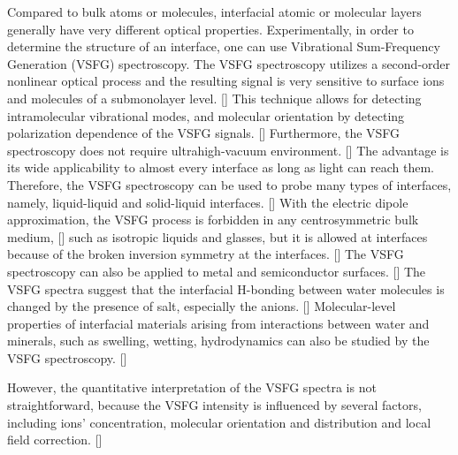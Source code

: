 Compared to bulk atoms or molecules,
interfacial atomic or molecular layers generally have very different optical properties. 
Experimentally, in order to determine the structure of an interface, one can use Vibrational Sum-Frequency Generation (VSFG) spectroscopy.
The VSFG spectroscopy utilizes a second-order nonlinear optical process and the resulting signal is very sensitive to surface ions and 
molecules of a submonolayer level. [\cite{Morita2008,WangHongFei2015,WenYuChieh2016,Ishiyama2017,Penalber-Johnstone2018}] 
This technique allows for detecting intramolecular vibrational modes, and molecular orientation by detecting polarization dependence of the VSFG signals. [\cite{Vidal05}]  
Furthermore, the VSFG spectroscopy does not require ultrahigh-vacuum environment. [\cite{WeiX02}]
The advantage is its wide applicability to almost every interface as long as light can reach them. 
Therefore, the VSFG spectroscopy can be used to probe many types of interfaces, namely, liquid-liquid and 
solid-liquid interfaces. [\cite{PGS88,RS91,QD93,QD94,Richmond02,Gopalakrishnan2006,ShenYR2006,Morita2008}]
With the electric dipole approximation, the VSFG process is forbidden in any centrosymmetric bulk medium, [\cite{Che12}] 
such as isotropic liquids and glasses,  but it is allowed at interfaces because of the broken inversion symmetry at the interfaces. [\cite{PF00}]
The VSFG spectroscopy can also be applied to metal and semiconductor surfaces. [\cite{Harris87,Superfine88}]
The VSFG spectra suggest that the interfacial H-bonding between water molecules is changed by the presence of salt, 
especially the anions. [\cite{EAR04}]
Molecular-level properties of interfacial materials arising from interactions between water and minerals, 
such as swelling, wetting, hydrodynamics can also be studied by the VSFG spectroscopy. [\cite{Rotenberg14}]

However, the quantitative interpretation of the VSFG spectra is not straightforward,
because the VSFG intensity is influenced by several factors, including ions' concentration, 
molecular orientation and distribution and local field correction. [\cite{Morita2008}]

